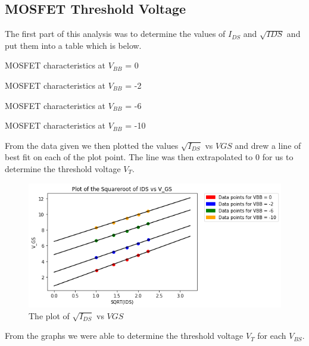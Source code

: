 \subsection{MOSFET Threshold Voltage}
 The first part of this analysis was to determine the values of $I_{DS}$ and $\sqrt{I{DS}}$ and put them into a table which is below.
 
 \begin{table}[h]
    
    \caption{MOSFET characteristics at $V_{BB}$ = 0}
    \label{tab:VBB0L}
\end{table}

\begin{table}[ht]
    
    \caption{MOSFET characteristics at $V_{BB}$ = -2}
    \label{tab:VBB2L}
\end{table}

\begin{table}[ht]
    
    \caption{MOSFET characteristics at $V_{BB}$ = -6}
    \label{tab:VBB6L}
\end{table}

\begin{table}[ht]
    
    \caption{MOSFET characteristics at $V_{BB}$ = -10}
    \label{tab:VBB10L}
\end{table}

From the data given we then plotted the values $\sqrt{I_{DS}}$ vs $V{GS}$ and drew a line of best fit on each of the plot point. The line was then extrapolated to 0 for us to determine the threshold voltage $V_T$.\\

\begin{figure}[ht]
    \centering
    \includegraphics[width=.96\linewidth]{figures/threshold_voltage_plot.png}
    \caption{The plot of $\sqrt{I_{DS}}$ vs $V{GS}$}
    \label{fig:thershold}
\end{figure}
From the graphs we were able to determine the threshold voltage $V_T$ for each $V_{BS}$. 

